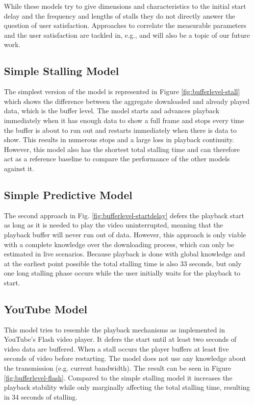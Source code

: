 While these models try to give dimensions and characteristics to the initial start delay and the frequency and lengths of stalls they do not directly answer the question of user satisfaction. Approaches to correlate the  measurable parameters and the user satisfaction are tackled in, e.g., \cite{ketyko2010qoe, mokmeasuring, gustafsson2008measmmmquality} and will also be a topic of our future work.



\subsection{Simple Stalling Model}

The simplest version of the model is represented in Figure \ref{fig:bufferlevel-stall} which shows the difference between the aggregate downloaded and already played data, which is the buffer level. The model starts and advances playback immediately when it has enough data to show a full frame and stops every time the buffer is about to run out and restarts immediately when there is data to show. This results in numerous stops and a large loss in playback continuity. However, this model also has the shortest total stalling time and can therefore act as a reference baseline to compare the performance of the other models against it.


\subsection{Simple Predictive Model}

The second approach in Fig. \ref{fig:bufferlevel-startdelay} defers the playback start as long as it is needed to play the video uninterrupted, meaning that the playback buffer will never run out of data. However, this approach is only viable with a complete knowledge over the downloading process, which can only be estimated in live scenarios. Because playback is done with global knowledge and at the earliest point possible the total stalling time is also 33 seconds, but only one long stalling phase occurs while the user initially waits for the playback to start.


\subsection{YouTube Model}

This model tries to resemble the playback mechanisms as implemented in YouTube's Flash video player.
It defers the start until at least two seconds of video data are buffered. When a stall occurs the player buffers at least five seconds of video before restarting. The model does not use any knowledge about the transmission (e.g. current bandwidth).
The result can be seen in Figure \ref{fig:bufferlevel-flash}. Compared to the simple stalling model it increases the playback stability while only marginally affecting the total stalling time, resulting in 34 seconds of stalling.

